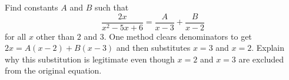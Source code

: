 Find constants $A$ and $B$ such that
\[\dfrac{2x}{x^2-5x+6}=\dfrac{A}{x-3}+\dfrac{B}{x-2}\]
for all $x$ other than $2$ and $3$. One method clears denominators to get $2x=A(x-2)+B(x-3)$ and then substitutes $x=3$ and $x=2$. Explain why this substitution is legitimate even though $x=2$ and $x=3$ are excluded from the original equation.
